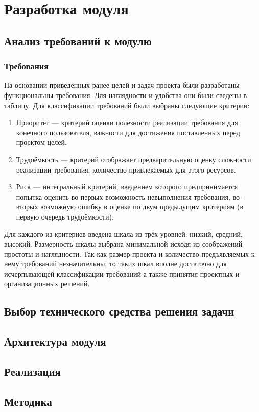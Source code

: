 \chapter*{Разработка модуля}

\section*{Анализ требований к модулю}

\subsection*{Требования}
На основании приведённых ранее целей и задач проекта были разработаны функциональны требования.
Для наглядности и удобства они были сведены в таблицу.
Для классификации требований были выбраны следующие критерии:
\begin{enumerate}
\item Приоритет --- критерий оценки полезности реализации требования для конечного пользователя,
важности для достижения поставленных перед проектом целей.
\item Трудоёмкость --- критерий отображает предварительную оценку сложности реализации требования,
количество привлекаемых для этого ресурсов.
\item Риск --- интегральный критерий, введением которого предпринимается попытка оценить во-первых
возможность невыполнения требования, во-вторых возможную ошибку в оценке по двум предыдущим
критериям (в первую очередь  трудоёмкости).
\end{enumerate}

Для каждого из критериев введена шкала из трёх уровней: низкий, средний, высокий.
Размерность шкалы выбрана минимальной исходя из соображений простоты и наглядности.
Так как размер проекта и количество предъявляемых к нему требований незначительны,
то таких шкал вполне достаточно для исчерпывающей классификации требований а также принятия
проектных и организационных решений.

\section*{Выбор технического средства решения задачи}

\section*{Архитектура модуля}

\section*{Реализация}

\section*{Методика}
